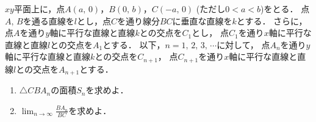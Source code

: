 \documentclass[../../main.tex]{subfiles}
\begin{document}
$xy$平面上に，点$A(a, \, 0)$，$B(0, \, b)$，$C(-a, \, 0)$ (ただし$0<a<b$)をとる．
点$A, \, B$を通る直線を$l$とし，点$C$を通り線分$BC$に垂直な直線を$k$とする．
さらに，点$A$を通り$y$軸に平行な直線と直線$k$との交点を$C_1$とし，
点$C_1$を通り$x$軸に平行な直線と直線$l$との交点を$A_1$とする．
以下，$n=1, \, 2, \, 3, \, \cdots$に対して，
点$A_n$を通り$y$軸に平行な直線と直線$k$との交点を$C_{n+1}$，
点$C_{n+1}$を通り$x$軸に平行な直線と直線$l$との交点を$A_{n+1}$とする．
\begin{enumerate}
  $A_n, \, C_n$の座標を求めよ．
  \item$\triangle CBA_n$の面積$S_n$を求めよ．
  \item$\displaystyle\lim_{n\to\infty}\frac{BA_n}{BC}$を求めよ．
\end{enumerate}
\end{document}
